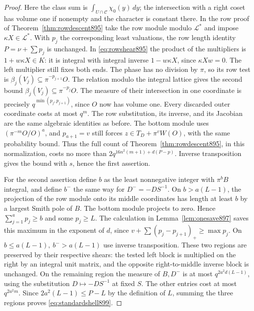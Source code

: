 \documentclass[a4paper,11pt]{article}
\theoremstyle{definition}
\theoremstyle{remark}
\numberwithin{equation}{section}
\begin{document}
\begin{proof}
Here the class sum is \(\int_{U\cap\mathcal C}\chi_0(y)\,dy\);
the intersection with a right coset has volume one if nonempty
and the character is constant there. In the row proof of
Theorem~\ref{thm:rowdescent895} take the row module modulo
\(\mathcal L^*\) and impose \(\kappa X\in\mathcal L^*\).
With \(p_j\) the corresponding least valuations, the row length
identity \(P=\nu+\sum p_j\) is unchanged. In
\eqref{eq:rowshear895} the product of the multipliers is
\(1+w\kappa X\in K\): it is integral with integral inverse
\(1-w\kappa X\), since \(\kappa Xw=0\). The left multiplier
still fixes both ends. The phase has no division by \(\pi\),
so its row test is \(\beta_j(V_j)\subseteq\pi^{-p_{j+1}}O\).
The relation modulo the integral lattice gives the second bound
\(\beta_j(V_j)\subseteq\pi^{-p_j}O\). The measure of their
intersection in one coordinate is precisely
\(q^{\min(p_j,p_{j+1})}\), since \(O\) now has volume one.
Every discarded outer coordinate costs at most \(q^m\).
The row substitution, its inverse, and its Jacobian are the
same algebraic identities as before. The bottom module uses
\((\pi^{-m}O/O)^a\), and \(p_{a+1}=v\) still forces
\(z\in T_D+\pi^vW(O)\), with the same probability bound.
Thus the full count of Theorem~\ref{thm:rowdescent895}, in this
normalization, costs no more than
\(2q^{16n^2(m+1)+d(P-p)}\). Inverse transposition gives the
bound with \(s\), hence the first assertion.

For the second assertion define \(b\) as the least nonnegative
integer with \(\pi^bB\) integral, and define \(b^-\) the same
way for \(D^-=-DS^{-1}\).
On \(b>a(L-1)\), the projection of the row module onto its middle
coordinates has length at least \(b\) by a largest Smith pole of
\(B\). The bottom module projects to zero. Hence
\(\sum_{j=1}^a p_j\ge b\) and some \(p_j\ge L\).
The calculation in Lemma~\ref{lem:onesave897} saves this maximum
in the exponent of \(d\), since
\(v+\sum(p_j-p_{j+1})_+\ge\max p_j\).
On \(b\le a(L-1),\ b^->a(L-1)\) use inverse transposition.
These two regions are preserved by their respective shears:
the tested left block is multiplied on the right by an integral
unit matrix, and the opposite right-to-middle inverse block is
unchanged. On the remaining region the measure of \(B,D^-\)
is at most \(q^{2a^2d(L-1)}\), using the substitution
\(D\mapsto-D S^{-1}\) at fixed \(S\). The other entries cost at
most \(q^{2a^2m}\). Since
\(2a^2(L-1)\le P-L\) by the definition of \(L\), summing the
three regions proves \eqref{eq:standardshell899}.
\end{proof}
\end{document}
